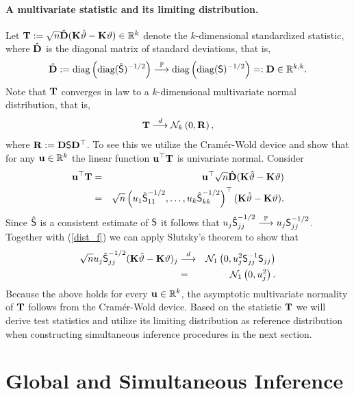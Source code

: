 \documentclass[12pt]{article}
\begin{document}
\paragraph{A multivariate statistic and its limiting distribution.}

Let $\T := \sqrt{n} \hat{\D} (\K \hat{\vartheta} - \K \vartheta) \in \R^k$
denote the $k$-dimensional standardized statistic, where $\hat{\D}$ is the
diagonal matrix of standard deviations, that is, 
\begin{eqnarray*}
\hat{\D} := \text{diag}\left(\text{diag}(\hat{\S })^{-1/2}\right) \cP \text{%
diag}\left(\text{diag}(\S )^{-1/2}\right) =: \D \in \R^{k,k}.
\end{eqnarray*}
Note that $\T$ converges in law to a $k$-dimensional multivariate normal
distribution, that is, 
\begin{eqnarray*}
\T \cL \N_k\left(0, \Cor\right),
\end{eqnarray*}
where $\Cor := \D \S \D^\top$. To see this we utilize the Cram{\'e}r-Wold
device \citep[e.g., Theorem 5.1.8
in][]{Lehmann1999} and show that for any $\uu \in \R^k$ the linear function $%
\uu^\top \T$ is univariate normal. Consider 
\begin{eqnarray*}
\uu^\top \T & = & \uu^\top \sqrt{n} \hat{\D} (\K \hat{\vartheta} - \K %
\vartheta) \\
& = & \sqrt{n} \left(u_1 \hat{\S }_{11}^{-1/2}, \dots, u_k \hat{\S }%
_{kk}^{-1/2}\right)^\top(\K \hat{\vartheta} - \K \vartheta).
\end{eqnarray*}
Since $\hat{\S }$ is a consistent estimate of $\S $ it follows that $u_j 
\hat{\S }_{jj}^{-1/2} \cP u_j \S _{jj}^{-1/2}$. Together with (\ref{dist_f})
we can apply Slutsky's theorem \citep[Theorem 2.3.3
in][]{Lehmann1999} to show that 
\begin{eqnarray*}
\sqrt{n} u_j \hat{\S }_{jj}^{-1/2} (\K \hat{\vartheta} - \K \vartheta)_j & %
\cL & \N_1\left(0, u_j^2 \S _{jj}^{-1} \S _{jj}\right) \\
& = & \N_1\left(0, u_j^2\right).
\end{eqnarray*}
Because the above holds for every $\uu \in \R^k$, the asymptotic
multivariate normality of $\T$ follows from the Cram{\'e}r-Wold device.
Based on the statistic $\T$ we will derive test statistics and utilize its
limiting distribution as reference distribution when constructing
simultaneous inference procedures in the next section.

\section{Global and Simultaneous Inference}
\end{document}
